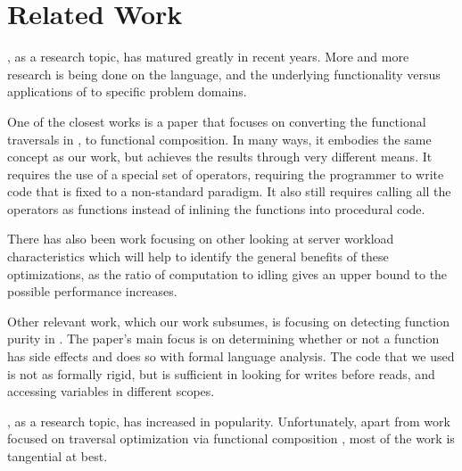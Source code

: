 \section{Related Work}

\javascript, as a research topic, has matured greatly in recent years.  More and more research is being done on \javascript the language, and the underlying functionality versus applications of \javascript to specific problem domains.

One of the closest works is a paper that focuses on converting the functional traversals in \javascript \cite{combinators15}, to functional composition.  In many ways, it embodies the same concept as our work, but achieves the results through very different means.  It requires the use of a special set of operators, requiring the programmer to write code that is fixed to a non-standard paradigm. It also still requires calling all the operators as functions instead of inlining the functions into procedural code.

There has also been work focusing on other looking at server workload characteristics \cite{workload14} which will help to identify the general benefits of these optimizations, as the ratio of computation to idling gives an upper bound to the possible performance increases.

Other relevant work, which our work subsumes, is focusing on detecting function purity in \javascript \cite{purity15}.  The paper's main focus is on determining whether or not a function has side effects and does so with formal language analysis.  The code that we used is not as formally rigid, but is sufficient in looking for writes before reads, and accessing variables in different scopes.  

\javascript, as a research topic, has increased in popularity. Unfortunately, apart from work focused on traversal optimization via functional composition \cite{combinators15}, most of the work is tangential at best.